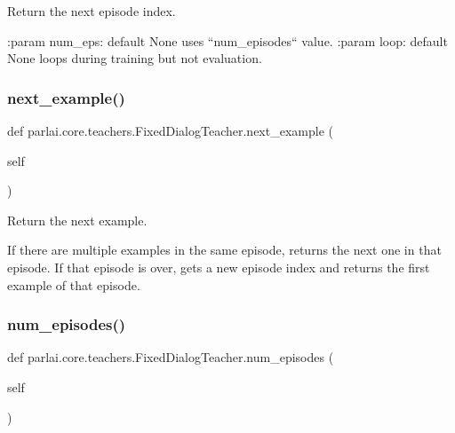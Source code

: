 \begin{DoxyVerb}Return the next episode index.

:param num_eps:
    default None uses ``num_episodes`` value.
:param loop:
    default None loops during training but not evaluation.
\end{DoxyVerb}
 \mbox{\label{classparlai_1_1core_1_1teachers_1_1FixedDialogTeacher_aa6782a610b00aa0675522aa58b03f20c}} 
\subsubsection{\texorpdfstring{next\+\_\+example()}{next\_example()}}
{\footnotesize\ttfamily def parlai.\+core.\+teachers.\+Fixed\+Dialog\+Teacher.\+next\+\_\+example (\begin{DoxyParamCaption}\item[{}]{self }\end{DoxyParamCaption})}

\begin{DoxyVerb}Return the next example.

If there are multiple examples in the same episode, returns the next one in that
episode. If that episode is over, gets a new episode index and returns the first
example of that episode.
\end{DoxyVerb}
 \mbox{\label{classparlai_1_1core_1_1teachers_1_1FixedDialogTeacher_a51e3463e7b7b44a6ea8b43fc82aacb75}} 
\subsubsection{\texorpdfstring{num\+\_\+episodes()}{num\_episodes()}}
{\footnotesize\ttfamily def parlai.\+core.\+teachers.\+Fixed\+Dialog\+Teacher.\+num\+\_\+episodes (\begin{DoxyParamCaption}\item[{}]{self }\end{DoxyParamCaption})}

